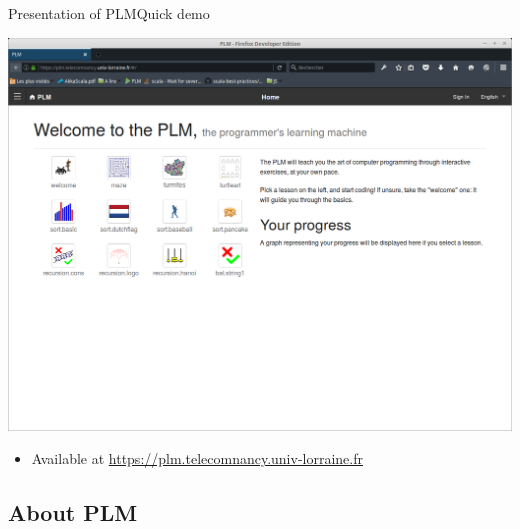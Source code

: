 \documentclass{beamer}
\begin{document}
\begin{frame}{Presentation of PLM}{Quick demo}
  \begin{center}
    \href{https://plm.telecomnancy.univ-lorraine.fr}{\includegraphics[scale=0.16]{img/screen-webPLM-1.png}}
    \begin{itemize}
    \item Available at \url{https://plm.telecomnancy.univ-lorraine.fr}
    \end{itemize}
  \end{center}
\end{frame}

\subsection{About PLM}

\end{document}
